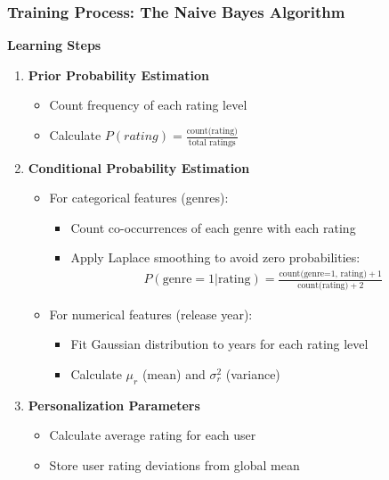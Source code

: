 \documentclass{beamer}
\begin{document}
\begin{frame}
\frametitle{Training Process: The Naive Bayes Algorithm}
\textbf{Learning Steps}
\begin{enumerate}
    \item \textbf{Prior Probability Estimation}
    \begin{itemize}
        \item Count frequency of each rating level
        \item Calculate $P(rating) = \frac{\text{count(rating)}}{\text{total ratings}}$
    \end{itemize}
    
    \item \textbf{Conditional Probability Estimation}
    \begin{itemize}
        \item For categorical features (genres):
        \begin{itemize}
            \item Count co-occurrences of each genre with each rating
            \item Apply Laplace smoothing to avoid zero probabilities:
            \begin{align*}
            P(\text{genre} = 1 | \text{rating}) = \frac{\text{count(genre=1, rating)} + 1}{\text{count(rating)} + 2}
            \end{align*}
        \end{itemize}
        \item For numerical features (release year):
        \begin{itemize}
            \item Fit Gaussian distribution to years for each rating level
            \item Calculate $\mu_r$ (mean) and $\sigma^2_r$ (variance)
        \end{itemize}
    \end{itemize}
    
    \item \textbf{Personalization Parameters}
    \begin{itemize}
        \item Calculate average rating for each user
        \item Store user rating deviations from global mean
    \end{itemize}
\end{enumerate}
\end{frame}
\end{document}
